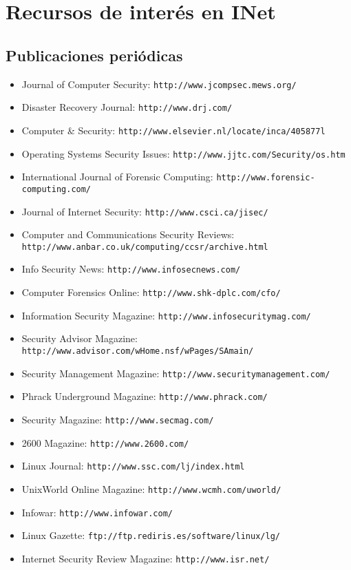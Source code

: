 \chapter{Recursos de inter\'es en INet}
\section{Publicaciones peri\'odicas}
\begin{itemize}
\item Journal of Computer Security: {\tt http://www.jcompsec.mews.org/}
\item Disaster Recovery Journal: {\tt http://www.drj.com/}
\item Computer \& Security: {\tt http://www.elsevier.nl/locate/inca/405877l}
\item Operating Systems Security Issues: {\tt http://www.jjtc.com/Security/os.htm}
\item International Journal of Forensic Computing: {\tt http://www.forensic-computing.com/}
\item Journal of Internet Security: {\tt http://www.csci.ca/jisec/}
\item Computer and Communications Security Reviews:\\
{\tt http://www.anbar.co.uk/computing/ccsr/archive.html}
\item Info Security News: {\tt http://www.infosecnews.com/}
\item Computer Forensics Online: {\tt http://www.shk-dplc.com/cfo/}
\item Information Security Magazine: {\tt http://www.infosecuritymag.com/}
\item Security Advisor Magazine: {\tt http://www.advisor.com/wHome.nsf/wPages/SAmain/}
\item Security Management Magazine: {\tt http://www.securitymanagement.com/}
\item Phrack Underground Magazine: {\tt http://www.phrack.com/}
\item Security Magazine: {\tt http://www.secmag.com/}
\item 2600 Magazine: {\tt http://www.2600.com/}
\item Linux Journal: {\tt http://www.ssc.com/lj/index.html}
\item UnixWorld Online Magazine: {\tt http://www.wcmh.com/uworld/}
\item Infowar: {\tt http://www.infowar.com/}
\item Linux Gazette: {\tt ftp://ftp.rediris.es/software/linux/lg/}
\item Internet Security Review Magazine: {\tt http://www.isr.net/}

\end{itemize}

